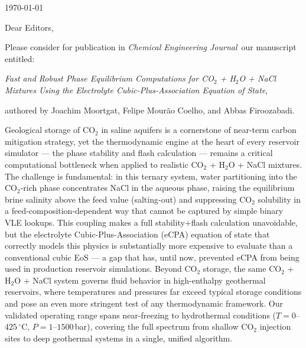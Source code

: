 \documentclass[11pt, a4paper]{letter}
\newcommand{\whichjob}{\textit{Chemical Engineering Journal}~}
\begin{document}
\begin{letter}{
    \smallskip\today\\\smallskip
}

\opening{\vspace*{0em}Dear Editors,}

Please consider for publication in \whichjob our manuscript entitled:

\textit{Fast and Robust Phase Equilibrium Computations for CO$_2$ + H$_2$O + NaCl Mixtures Using the Electrolyte Cubic-Plus-Association Equation of State},

authored by Joachim Moortgat, Felipe Mourão Coelho, and Abbas Firoozabadi.

Geological storage of CO$_2$ in saline aquifers is a cornerstone of near-term carbon mitigation strategy, yet the thermodynamic engine at the heart of every reservoir simulator --- the phase stability and flash calculation --- remains a critical computational bottleneck when applied to realistic CO$_2$ + H$_2$O + NaCl mixtures. The challenge is fundamental: in this ternary system, water partitioning into the CO$_2$-rich phase concentrates NaCl in the aqueous phase, raising the equilibrium brine salinity above the feed value (salting-out) and suppressing CO$_2$ solubility in a feed-composition-dependent way that cannot be captured by simple binary VLE lookups. This coupling makes a full stability$+$flash calculation unavoidable, but the electrolyte Cubic-Plus-Association (eCPA) equation of state that correctly models this physics is substantially more expensive to evaluate than a conventional cubic EoS --- a gap that has, until now, prevented eCPA from being used in production reservoir simulations. Beyond CO$_2$ storage, the same CO$_2$ + H$_2$O + NaCl system governs fluid behavior in high-enthalpy geothermal reservoirs, where temperatures and pressures far exceed typical storage conditions and pose an even more stringent test of any thermodynamic framework. Our validated operating range spans near-freezing to hydrothermal conditions ($T = 0$--$425\,^\circ$C, $P = 1$--$1500$\,bar), covering the full spectrum from shallow CO$_2$ injection sites to deep geothermal systems in a single, unified algorithm.


\end{letter}
\end{document}
